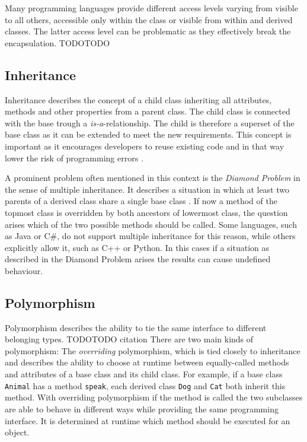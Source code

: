 Many programming languages provide different access levels varying from visible to all others, accessible only within the class or visible from within and derived classes. The latter access level can be problematic as they effectively break the encapsulation. TODOTODO

\subsection{Inheritance}
Inheritance describes the concept of a child class inheriting all attributes, methods and other properties from a parent class. The child class is connected with the base trough a \emph{is-a}-relationship. The child is therefore a superset of the base class as it can be extended to meet the new requirements. This concept is important as it encourages developers to reuse existing code and in that way lower the risk of programming errors \cite{johnson91}. 

A prominent problem often mentioned in this context is the \emph{Diamond Problem} in the sense of multiple inheritance. It describes a situation in which at least two parents of a derived class share a single base class \cite{Truyen04}. If now a method of the topmost class is overridden by both ancestors of lowermost class, the question arises which of the two possible methods should be called. Some languages, such as Java or C\#, do not support multiple inheritance for this reason, while others explicitly allow it, such as C++ or Python. In this cases if a situation as described in the Diamond Problem arises the results can cause undefined behaviour.

\subsection{Polymorphism}

Polymorphism describes the ability to tie the same interface to different belonging types. TODOTODO citation There are two main kinds of polymorphism: The \emph{overriding} polymorphism, which is tied closely to inheritance and describes the ability to choose at runtime between equally-called methods and attributes of a base class and its child class. For example, if a base class \texttt{Animal} has a method \texttt{speak}, each derived class \texttt{Dog} and \texttt{Cat} both inherit this method. With overriding polymorphism if the method is called the two subclasses are able to behave in different ways while providing the same programming interface. It is determined at runtime which method should be executed for an object. 

